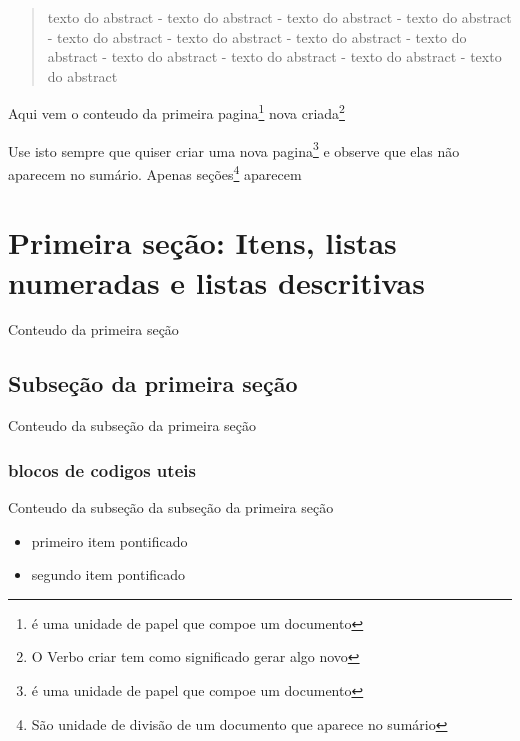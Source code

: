 \documentclass[12pt,a4paper]{article}
\begin{document}


\newpage
\tableofcontents
\thispagestyle{empty}
\newpage


\begin{abstract}
texto do abstract - texto do abstract - texto do abstract - texto do abstract - texto do abstract - texto do abstract - texto do abstract - texto do abstract - texto do abstract - texto do abstract - texto do abstract - texto do abstract
\end{abstract}


\newpage %
Aqui vem o conteudo da primeira pagina\footnote{é uma unidade de papel que compoe um documento} nova criada\footnote{O Verbo criar tem como significado gerar algo novo}

\newpage %
Use isto sempre que quiser criar uma nova pagina\footnote{é uma unidade de papel que compoe um documento} e observe que elas não aparecem no sumário. Apenas seções\footnote{São unidade de divisão de um documento que aparece no sumário} aparecem

\newpage
\section{Primeira seção: Itens, listas numeradas e listas descritivas}
Conteudo da primeira seção

\subsection{Subseção da primeira seção}
Conteudo da subseção da primeira seção

\subsubsection{blocos de codigos uteis}
Conteudo da subseção da subseção da primeira seção

\begin{itemize}
\item primeiro item pontificado
\item segundo item pontificado
\end{itemize}
\end{document}
